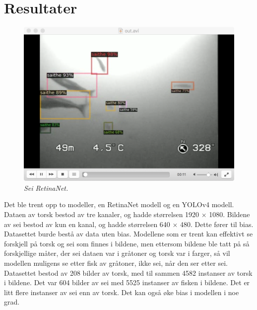 

\section{Resultater}

\begin{figure}[h!]
\begin{center} 
\includegraphics[scale=0.35]{figures/retinanet_inference_saithe}
\caption{\small \sl Sei RetinaNet. \label{fig:retinanet_inference_saithe}}
\end{center}
\end{figure}

Det ble trent opp to modeller, en RetinaNet modell og en YOLOv4 modell. Dataen av torsk bestod av tre kanaler, og hadde størrelsen 1920 $\times$ 1080. Bildene av sei bestod av kun en kanal, og hadde størrelsen 640 $\times$ 480. Dette fører til bias. Datasettet burde bestå av data uten bias. Modellene som er trent kan effektivt se forskjell på torsk og sei som finnes i bildene, men ettersom bildene ble tatt på så forskjellige måter, der sei dataen var i gråtoner og torsk var i farger, så vil modellen muligens se etter fisk av gråtoner, ikke sei, når den ser etter sei. Datasettet bestod av 208 bilder av torsk, med til sammen 4582 instanser av torsk i bildene. Det var 604 bilder av sei med 5525 instanser av fisken i bildene. Det er litt flere instanser av sei enn av torsk. Det kan også øke bias i modellen i noe grad.

